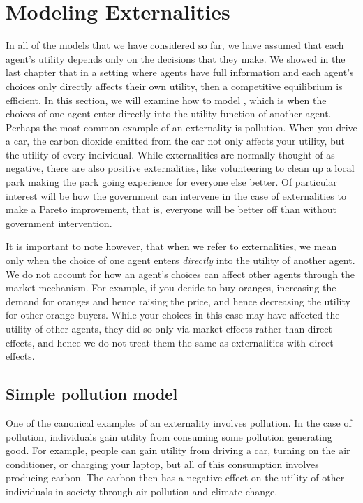 \section{Modeling Externalities}
In all of the models that we have considered so far, we have assumed that each agent's utility depends only on the decisions that they make. We showed in the last chapter that in a setting where agents have full information and each agent's choices only directly affects their own utility, then a competitive equilibrium is efficient. In this section, we will examine how to model , which is when the choices of one agent enter directly into the utility function of another agent. Perhaps the most common example of an externality is pollution. When you drive a car, the carbon dioxide emitted from the car not only affects your utility, but the utility of every individual. While externalities are normally thought of as negative, there are also positive externalities, like volunteering to clean up a local park making the park going experience for everyone else better. Of particular interest will be how the government can intervene in the case of externalities to make a Pareto improvement, that is, everyone will be better off than without government intervention. 

It is important to note however, that when we refer to externalities, we mean only when the choice of one agent enters \emph{directly} into the utility of another agent. We do not account for how an agent's choices can affect other agents through the market mechanism. For example, if you decide to buy oranges, increasing the demand for oranges and hence raising the price, and hence decreasing the utility for other orange buyers. While your choices in this case may have affected the utility of other agents, they did so only via market effects rather than direct effects, and hence we do not treat them the same as externalities with direct effects. 

\subsection*{Simple pollution model}
One of the canonical examples of an externality involves pollution. In the case of pollution, individuals gain utility from consuming some pollution generating good. For example, people can gain utility from driving a car, turning on the air conditioner, or charging your laptop, but all of this consumption involves producing carbon. The carbon then has a negative effect on the utility of other individuals in society through air pollution and climate change. 

